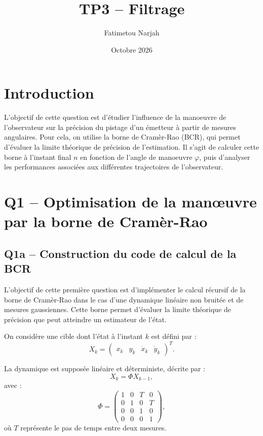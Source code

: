 \documentclass[12pt,a4paper]{article}
\title{\textbf{TP3 -- Filtrage}}
\author{Fatimetou Narjah}
\date{Octobre 2026}
\begin{document}
\maketitle

\section{Introduction}

L'objectif de cette question est d'étudier l'influence
de la manoeuvre de l'observateur sur la précision du
pistage d'un émetteur à partir de mesures angulaires.
Pour cela, on utilise la borne de Cramèr-Rao (BCR),
qui permet d'évaluer la limite théorique de précision
de l'estimation. Il s'agit de calculer cette borne à
l'instant final $n$ en fonction de l'angle de manoeuvre
$\varphi$, puis d'analyser les performances associées
aux différentes trajectoires de l'observateur.


\section{Q1 -- Optimisation de la manœuvre par la borne de Cramèr-Rao}

\subsection{Q1a -- Construction du code de calcul de la BCR}

L'objectif de cette première question est d'implémenter le calcul récursif de la borne de Cramèr-Rao dans le cas d'une dynamique linéaire non bruitée et de mesures gaussiennes. Cette borne permet d'évaluer la limite théorique de précision que peut atteindre un estimateur de l'état.

On considère une cible dont l'état à l'instant $k$ est défini par :
\begin{equation}
X_k =
\begin{pmatrix}
x_k & y_k & \dot{x}_k & \dot{y}_k
\end{pmatrix}^{T}.
\end{equation}

La dynamique est supposée linéaire et déterministe, décrite par :
\begin{equation}
X_k = \Phi X_{k-1},
\end{equation}
avec :
\begin{equation}
\Phi =
\begin{pmatrix}
1 & 0 & T & 0\\
0 & 1 & 0 & T\\
0 & 0 & 1 & 0\\
0 & 0 & 0 & 1
\end{pmatrix},
\end{equation}
où $T$ représente le pas de temps entre deux mesures.
\end{document}
